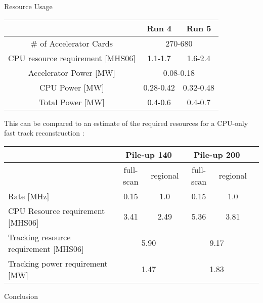 \documentclass[final]{beamer}
\newlength{\colwidth}
\begin{document}
\begin{frame}[t]
\begin{columns}[t]
\begin{column}{\colwidth}
\begin{block}{Resource Usage}
    \begin{table} [htb!]
      \centering
        \begin{tabular}{|c|c|c|}
          \hline
              & Run 4 & Run 5 \\
          \hline
              \# of Accelerator Cards & \multicolumn{2}{c|}{270-680} \\ %
              CPU resource requirement [MHS06] & 1.1-1.7 & 1.6-2.4\\ %
              \hline \hline
              Accelerator Power [MW] & \multicolumn{2}{c|}{0.08-0.18} \\
              CPU Power [MW] & 0.28-0.42 & 0.32-0.48 \\ \hline %
              Total Power [MW] & 0.4-0.6 & 0.4-0.7 \\
              \hline
        \end{tabular}
    \end{table}

      This can be compared to an estimate of the required resources for a CPU-only fast track reconstruction \cite{TDR_Amend}:
      
      \begin{table}[ht!]
        \centering
        \begin{tabular}{|l||c|c||c|c|c|} \hline
        & \multicolumn{2}{c||}{Pile-up 140} & \multicolumn{2}{c|}{Pile-up 200} \\ \hline
        & full-scan & regional & full-scan & regional \\ \hline
      Rate [MHz] & 0.15 & 1.0 & 0.15 & 1.0 \\
      CPU Resource requirement [MHS06] & 3.41 & 2.49 & 5.36 & 3.81 \\ \hline
      Tracking resource requirement [MHS06] & \multicolumn{2}{c||}{5.90} & \multicolumn{2}{c|}{9.17} \\
      Tracking power requirement [MW] & \multicolumn{2}{c||}{1.47} & \multicolumn{2}{c|}{1.83} \\
      \hline
        \end{tabular}
      \end{table}

  \end{block}

  \begin{exampleblock}{Conclusion}


\end{exampleblock}
\end{column}
\end{columns}
\end{frame}
\end{document}
